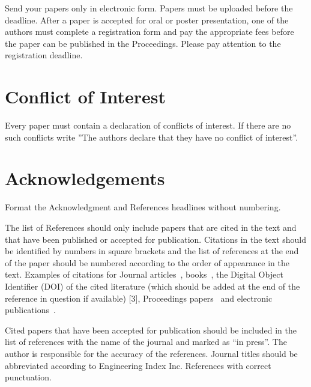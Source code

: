 \documentclass[nouppercase]{ifmbe}
\begin{document}
Send your papers only in electronic form. Papers must be uploaded before
the deadline. After a paper is accepted for oral or poster presentation,
one of the authors must complete a registration form and pay the
appropriate fees before the paper can be published in the Proceedings.
Please pay attention to the registration deadline.

\section*{Conflict of Interest}
Every paper must contain a declaration of conflicts of interest. If there are no such conflicts write ''The authors declare that they have no conflict of interest''.


\section*{Acknowledgements}

Format the Acknowledgment and References headlines without numbering.

\bigskip
The list of References should only include papers that are cited in the
text and that have been published or accepted for publication. Citations
in the text should be identified by numbers in square brackets and the
list of references at the end of the paper should be numbered according
to the order of appearance in the text. Examples of citations for
Journal articles~\cite{c1}, books~\cite{c2}, the Digital
Object Identifier (DOI) of the cited literature (which should be added
at the end of the reference in question if available) [3], Proceedings
papers~\cite{c1} and electronic publications~\cite{c2}.

Cited papers that have been accepted for publication should be included
in the list of references with the name of the journal and marked as
``in press''. The author is responsible for the accuracy of the
references. Journal titles should be abbreviated according to
Engineering Index Inc. References with correct punctuation.

%
\end{document}
